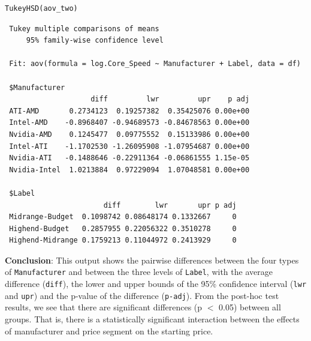\documentclass[a4paper]{article}
\begin{document}
\begin{mdframed}[leftline=false,rightline=false,backgroundcolor=lightblue!10,nobreak=false]
    \begin{verbatim}
TukeyHSD(aov_two)
    \end{verbatim}
\end{mdframed}
\begin{lstlisting}
 Tukey multiple comparisons of means
     95% family-wise confidence level

 Fit: aov(formula = log.Core_Speed ~ Manufacturer + Label, data = df)

 $Manufacturer
                    diff         lwr         upr    p adj
 ATI-AMD       0.2734123  0.19257382  0.35425076 0.00e+00
 Intel-AMD    -0.8968407 -0.94689573 -0.84678563 0.00e+00
 Nvidia-AMD    0.1245477  0.09775552  0.15133986 0.00e+00
 Intel-ATI    -1.1702530 -1.26095908 -1.07954687 0.00e+00
 Nvidia-ATI   -0.1488646 -0.22911364 -0.06861555 1.15e-05
 Nvidia-Intel  1.0213884  0.97229094  1.07048581 0.00e+00

 $Label
                       diff        lwr       upr p adj
 Midrange-Budget  0.1098742 0.08648174 0.1332667     0
 Highend-Budget   0.2857955 0.22056322 0.3510278     0
 Highend-Midrange 0.1759213 0.11044972 0.2413929     0
\end{lstlisting}
\textbf{Conclusion}: This output shows the pairwise differences between the four types of \verb|Manufacturer| and between the three levels of \verb|Label|, with the average difference (\verb|diff|), the lower and upper bounds of the 95\% confidence interval (\verb|lwr| and \verb|upr|) and the p-value of the difference (\verb|p-adj|).
From the post-hoc test results, we see that there are significant differences (p $<$ 0.05) between all groups. That is, there is a statistically significant interaction between the effects of manufacturer and price segment on the starting price.
\end{document}
